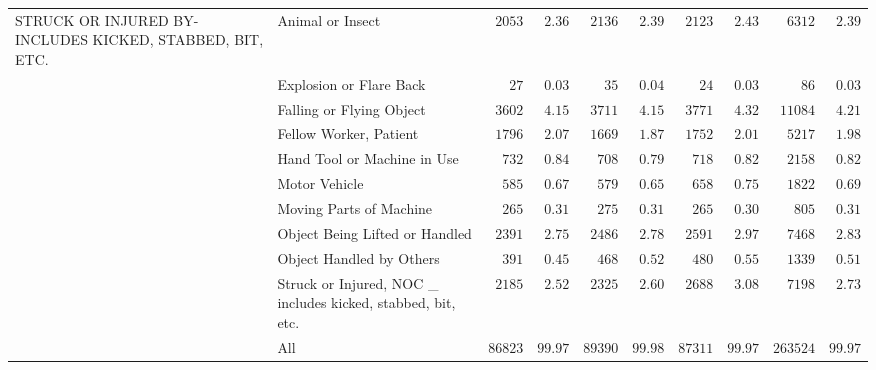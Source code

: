 \documentclass[9pt, oneside]{article}   	%
\begin{document}
\begin{longtable}{p{1.8in}p{2.2in}cccccccc}
STRUCK OR INJURED BY-INCLUDES KICKED, STABBED, BIT, ETC. & Animal or Insect  & $\phantom{0}2053$ & $\phantom{0}2.36$ & $\phantom{0}2136$ & $\phantom{0}2.39$ & $\phantom{0}2123$ & $\phantom{0}2.43$ & $\phantom{00}6312$ & $\phantom{0}2.39$ \\
 & Explosion or Flare Back  & $\phantom{000}27$ & $\phantom{0}0.03$ & $\phantom{000}35$ & $\phantom{0}0.04$ & $\phantom{000}24$ & $\phantom{0}0.03$ & $\phantom{0000}86$ & $\phantom{0}0.03$ \\
 & Falling or Flying Object  & $\phantom{0}3602$ & $\phantom{0}4.15$ & $\phantom{0}3711$ & $\phantom{0}4.15$ & $\phantom{0}3771$ & $\phantom{0}4.32$ & $\phantom{0}11084$ & $\phantom{0}4.21$ \\
 & Fellow Worker, Patient  & $\phantom{0}1796$ & $\phantom{0}2.07$ & $\phantom{0}1669$ & $\phantom{0}1.87$ & $\phantom{0}1752$ & $\phantom{0}2.01$ & $\phantom{00}5217$ & $\phantom{0}1.98$ \\
 & Hand Tool or Machine in Use  & $\phantom{00}732$ & $\phantom{0}0.84$ & $\phantom{00}708$ & $\phantom{0}0.79$ & $\phantom{00}718$ & $\phantom{0}0.82$ & $\phantom{00}2158$ & $\phantom{0}0.82$ \\
 & Motor Vehicle  & $\phantom{00}585$ & $\phantom{0}0.67$ & $\phantom{00}579$ & $\phantom{0}0.65$ & $\phantom{00}658$ & $\phantom{0}0.75$ & $\phantom{00}1822$ & $\phantom{0}0.69$ \\
 & Moving Parts of Machine  & $\phantom{00}265$ & $\phantom{0}0.31$ & $\phantom{00}275$ & $\phantom{0}0.31$ & $\phantom{00}265$ & $\phantom{0}0.30$ & $\phantom{000}805$ & $\phantom{0}0.31$ \\
 & Object Being Lifted or Handled  & $\phantom{0}2391$ & $\phantom{0}2.75$ & $\phantom{0}2486$ & $\phantom{0}2.78$ & $\phantom{0}2591$ & $\phantom{0}2.97$ & $\phantom{00}7468$ & $\phantom{0}2.83$ \\
 & Object Handled by Others  & $\phantom{00}391$ & $\phantom{0}0.45$ & $\phantom{00}468$ & $\phantom{0}0.52$ & $\phantom{00}480$ & $\phantom{0}0.55$ & $\phantom{00}1339$ & $\phantom{0}0.51$ \\
 & Struck or Injured, NOC \_ includes kicked, stabbed, bit, etc.  & $\phantom{0}2185$ & $\phantom{0}2.52$ & $\phantom{0}2325$ & $\phantom{0}2.60$ & $\phantom{0}2688$ & $\phantom{0}3.08$ & $\phantom{00}7198$ & $\phantom{0}2.73$ \\
\cline{1-1} \cline{2-2} \cline{3-3} \cline{4-4} \cline{5-5} \cline{6-6} \cline{7-7} \cline{8-8} \cline{9-9} \cline{10-10} %
 & All  & $86823$ & $99.97$ & $89390$ & $99.98$ & $87311$ & $99.97$ & $263524$ & $99.97$ \\
\hline 
\end{longtable}
\end{document}
